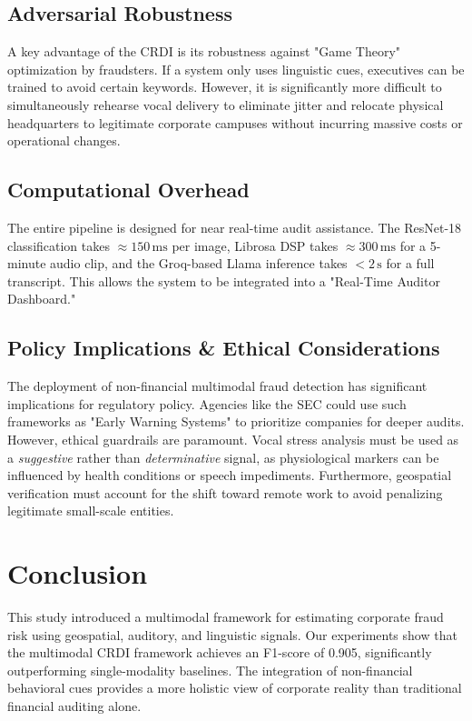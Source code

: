 \documentclass[conference]{IEEEtran}
\begin{document}
\subsection{Adversarial Robustness}
A key advantage of the CRDI is its robustness against "Game Theory" optimization by fraudsters. If a system only uses linguistic cues, executives can be trained to avoid certain keywords. However, it is significantly more difficult to simultaneously rehearse vocal delivery to eliminate jitter and relocate physical headquarters to legitimate corporate campuses without incurring massive costs or operational changes.

\subsection{Computational Overhead}
The entire pipeline is designed for near real-time audit assistance. The ResNet-18 classification takes $\approx 150\,\mathrm{ms}$ per image, Librosa DSP takes $\approx 300\,\mathrm{ms}$ for a 5-minute audio clip, and the Groq-based Llama inference takes $< 2\,\mathrm{s}$ for a full transcript. This allows the system to be integrated into a "Real-Time Auditor Dashboard."

\subsection{Policy Implications \& Ethical Considerations}
The deployment of non-financial multimodal fraud detection has significant implications for regulatory policy. Agencies like the SEC could use such frameworks as "Early Warning Systems" to prioritize companies for deeper audits. However, ethical guardrails are paramount. Vocal stress analysis must be used as a \emph{suggestive} rather than \emph{determinative} signal, as physiological markers can be influenced by health conditions or speech impediments. Furthermore, geospatial verification must account for the shift toward remote work to avoid penalizing legitimate small-scale entities.

\section{Conclusion}

This study introduced a multimodal framework for estimating corporate fraud
risk using geospatial, auditory, and linguistic signals. Our experiments show that the multimodal CRDI framework achieves an F1-score of 0.905, significantly outperforming single-modality baselines. The integration of non-financial behavioral cues provides a more holistic view of corporate reality than traditional financial auditing alone.
\end{document}

